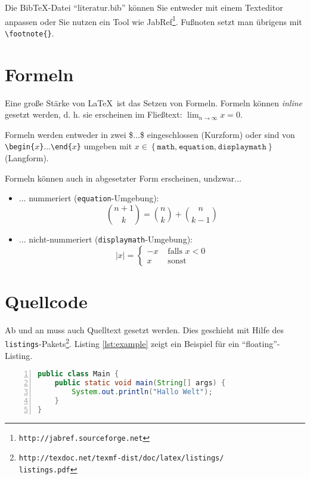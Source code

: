 \documentclass[ngerman]{ewks-latex}
\begin{document}
Die Bib\TeX-Datei "`literatur.bib"' können Sie entweder mit einem Texteditor anpassen oder Sie nutzen ein Tool wie JabRef\footnote{\texttt{http://jabref.sourceforge.net}}. Fußnoten setzt man übrigens mit \texttt{\textbackslash footnote\{\}}.

\section{Formeln}
Eine große Stärke von \LaTeX \ ist das Setzen von Formeln. Formeln können \textit{inline} gesetzt werden, d. h. sie erscheinen im Fließtext: $\lim_{n\rightarrow \infty}x=0$.

Formeln werden entweder in zwei \$...\$ eingeschlossen (Kurzform) oder sind von \texttt{\textbackslash begin\{$x$\}}...\texttt{\textbackslash end\{$x$\}} umgeben mit $x\in\left\{ \mathtt{math\textrm{,}\:\mathtt{equation\textrm{,}\: displaymath}}\right\}$ (Langform).

Formeln können auch in abgesetzter Form erscheinen, undzwar...
\begin{itemize}
\item ... nummeriert (\texttt{equation}-Umgebung):
\begin{equation}
{n+1\choose k} = {n\choose k} + {n \choose k-1}
\end{equation}

\item ... nicht-nummeriert (\texttt{displaymath}-Umgebung):
\begin{displaymath}
|x| = \left\{ \begin{array}{rl}
 -x &\mbox{ falls $x<0$} \\
  x &\mbox{ sonst}
       \end{array} \right.
\end{displaymath}
\end{itemize} 



\section{Quellcode}
Ab und an muss auch Quelltext gesetzt werden. Dies geschieht mit Hilfe des \texttt{listings}-Pakets\footnote{\texttt{http://texdoc.net/texmf-dist/doc/latex/listings/\\listings.pdf}}. Listing \ref{lst:example} zeigt ein Beispiel für ein "`floating"'-Listing.

\begin{lstlisting}[float, caption=Beispiel eines Java-Listings, label=lst:example, language=java, basicstyle=\small, tabsize=4, showstringspaces=false, numbers=left, frame=single, keywordstyle=\bfseries]
public class Main {
	public static void main(String[] args) {
		System.out.println("Hallo Welt");
	}
}
\end{lstlisting}
\end{document}
